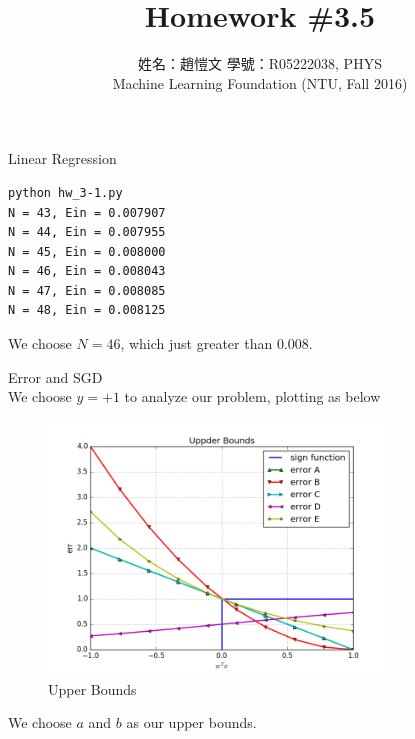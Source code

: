 \documentclass[12pt]{article}
\newenvironment{prob}[2][Prob.]{\begin{trivlist}
\item[\hskip \labelsep {\bfseries #1}\hskip \labelsep {\bfseries #2}]}{\end{trivlist}}
\begin{document}
\begin{CJK}{UTF8}{bsmi}
 
 
 
\title{Homework \#3.5}%
\author{姓名：趙愷文 學號：R05222038, PHYS\\ %
Machine Learning Foundation (NTU, Fall 2016)} %
 
\maketitle

\begin{prob}{1} - Linear Regression\\
\begin{lstlisting}
python hw_3-1.py
N = 43, Ein = 0.007907
N = 44, Ein = 0.007955
N = 45, Ein = 0.008000
N = 46, Ein = 0.008043
N = 47, Ein = 0.008085
N = 48, Ein = 0.008125
\end{lstlisting}
We choose $N = 46$, which just greater than $0.008$.
\end{prob}

\begin{prob}{2} - Error and SGD\\
We choose $y= +1$ to analyze our problem, plotting as below
\begin{figure}[H]
	\centering
	\includegraphics[width=0.8\textwidth]{../results/figure_2.png}
	\caption{Upper Bounds}
\end{figure}
We choose $a$ and $b$ as our upper bounds.
\end{prob}


\end{CJK}
\end{document}
